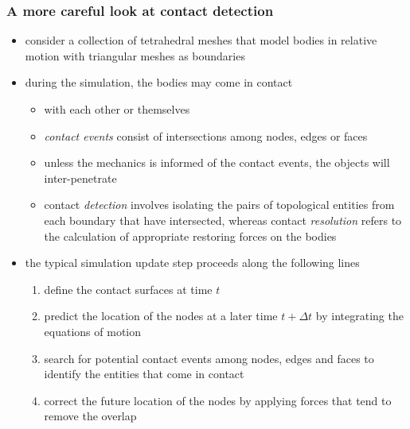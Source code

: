 %
%


\begin{frame}[fragile]
%
  \frametitle{A more careful look at contact detection}
%
  \begin{itemize}
%
  \item consider a collection of tetrahedral meshes that model bodies in relative motion with
    triangular meshes as boundaries
%
  \item during the simulation, the bodies may come in contact
    \begin{itemize}
    \item with each other or themselves
    \item {\em contact events} consist of intersections among nodes, edges or faces
    \item unless the mechanics is informed of the contact events, the objects will
      inter-penetrate
    \item contact {\em detection} involves isolating the pairs of topological entities from
      each boundary that have intersected, whereas contact {\em resolution} refers to the
      calculation of appropriate restoring forces on the bodies
    \end{itemize}
%
  \item the typical simulation update step proceeds along the following lines
    \begin{enumerate}
    \item define the contact surfaces at time $t$
    \item predict the location of the nodes at a later time $t+\Delta t$ by integrating the
      equations of motion
    \item search for potential contact events among nodes, edges and faces to identify the
      entities that come in contact \label{item:contact-search}
    \item correct the future location of the nodes by applying forces that tend to remove the
      overlap
    \end{enumerate}
%
  \end{itemize}
%
\end{frame}

